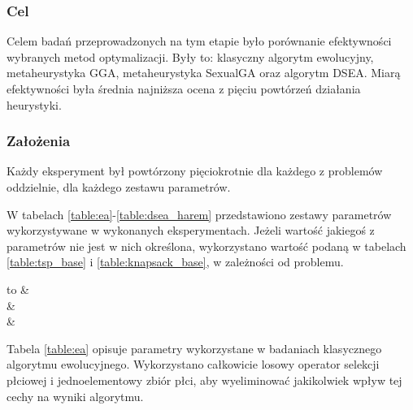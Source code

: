 \documentclass[./FM_mgr.tex]{subfiles}
\begin{document}
\subsubsection*{Cel}
Celem badań przeprowadzonych na tym etapie było porównanie efektywności wybranych metod optymalizacji.
Były to: klasyczny algorytm ewolucyjny, metaheurystyka GGA, metaheurystyka SexualGA oraz algorytm DSEA.
Miarą efektywności była średnia najniższa ocena z pięciu powtórzeń działania heurystyki.

\subsubsection*{Założenia} 
Każdy eksperyment był powtórzony pięciokrotnie dla każdego z problemów oddzielnie, dla każdego zestawu parametrów.

W tabelach \ref{table:ea}-\ref{table:dsea_harem} przedstawiono zestawy parametrów wykorzystywane w wykonanych eksperymentach. 
Jeżeli wartość jakiegoś z parametrów nie jest w nich określona, wykorzystano wartość podaną w tabelach \ref{table:tsp_base} i \ref{table:knapsack_base}, w zależności od problemu.

\begin{table}
	\caption{Założenia dot. wartości parametrów standardowego algorytmu ewolucyjnego \label{table:ea}}
	\centering
	\begin{tabu} to \textwidth {lX}
		\hline
		 &
		 \\ 
		\hline
		 & 
		 \\ 
		\hline
		 & 
		 \\ 
		\hline
	\end{tabu}
\end{table}

Tabela \ref{table:ea} opisuje parametry wykorzystane w badaniach klasycznego algorytmu ewolucyjnego. 
Wykorzystano całkowicie losowy operator selekcji płciowej i jednoelementowy zbiór płci, aby wyeliminować jakikolwiek wpływ tej cechy na wyniki algorytmu. 
\end{document}
